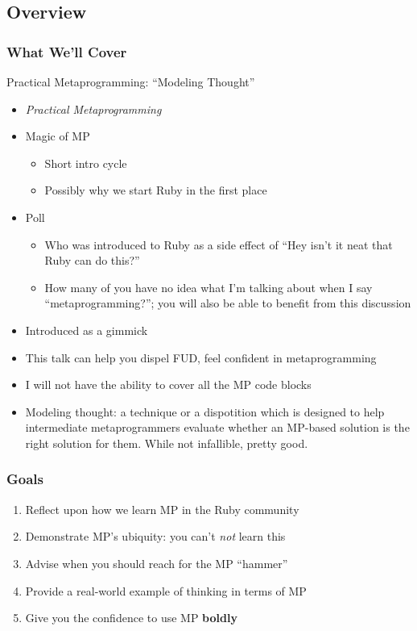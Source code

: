 \documentclass[slidestop,compress,mathserif]{beamer}
\begin{document}
\subsection{Overview}

\begin{frame}
	\frametitle{What We'll Cover}
	\begin{center}
		Practical Metaprogramming:  ``Modeling Thought''
	\end{center}
\end{frame}
\note
{
\tiny
\begin{itemize}
	\item \emph{Practical Metaprogramming}
	\item Magic of MP
	\begin{itemize}
		\tiny
		\item Short intro cycle
		\item Possibly why we start Ruby in the first place
	\end{itemize}
	\item Poll
	\begin{itemize}
		\tiny
		\item Who was introduced to Ruby as a side effect of ``Hey isn't it neat that Ruby can do this?''
		\item How many of you have no idea what I'm talking about when I say ``metaprogramming?''; you will also be able to benefit from this discussion
	\end{itemize}
	\item Introduced as a gimmick
	\item This talk can	help you dispel FUD, feel confident in metaprogramming
	\item I	will not have the ability to cover all the MP code blocks
	\item Modeling thought: a technique or a dispotition which is designed to help intermediate metaprogrammers evaluate whether an MP-based
	solution is the right solution for them.  While not infallible, pretty good.
\end{itemize}
\normalsize
}

\begin{frame}
	\frametitle{Goals}
	\begin{enumerate}
		\item Reflect upon how we learn MP in the Ruby community
		\pause
		\item Demonstrate MP's ubiquity:  you can't \emph{not} learn this
		\pause
		\item Advise when you should reach for the MP ``hammer''
		\pause
		\item Provide a real-world example of thinking in terms of MP
		\pause
		\item Give you the confidence to use MP \textbf{boldly}
	\end{enumerate}
\end{frame}
\end{document}
